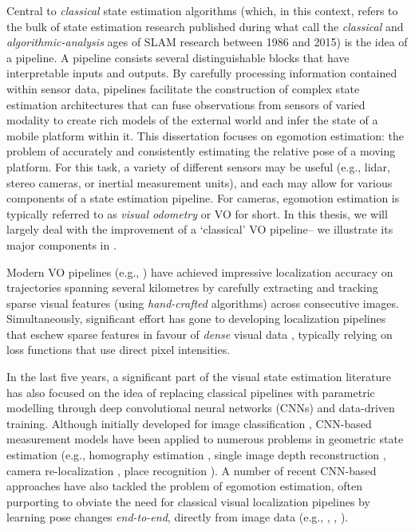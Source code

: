 Central to \textit{classical} state estimation algorithms (which, in this context, refers to the bulk of state estimation research published during what \cite{Cadena2016-ds} call the \textit{classical} and \textit{algorithmic-analysis} ages of SLAM research between 1986 and 2015) is the idea of a pipeline. A pipeline consists several distinguishable blocks that have interpretable inputs and outputs.  By carefully processing information contained within sensor data, pipelines facilitate the construction of complex state estimation architectures that can fuse observations from sensors of varied modality to create rich models of the external world and infer the state of a mobile platform within it. This dissertation focuses on egomotion estimation: the problem of accurately and consistently estimating the relative pose of a moving platform. For this task, a variety of different sensors may be useful (e.g., lidar, stereo cameras, or inertial measurement units), and each may allow for various components of a state estimation pipeline. For cameras, egomotion estimation is typically referred to as \textit{visual odometry} or VO for short. In this thesis, we will largely deal with the improvement of a `classical' VO pipeline-- we illustrate its major components in . 




Modern VO pipelines (e.g., \cite{Leutenegger2015-fk, Cvisic2015-mt, Tsotsos2015}) have achieved impressive localization accuracy on trajectories spanning several kilometres by carefully extracting and tracking sparse visual features (using \textit{hand-crafted} algorithms) across consecutive images. Simultaneously, significant effort has gone to developing localization pipelines that eschew sparse features in favour of \textit{dense} visual data \citep{Alcantarilla2016-kv, forster2014svo}, typically relying on loss functions that use direct pixel intensities. 

In the last five years, a significant part of the visual state estimation literature has also focused on the idea of replacing classical pipelines with parametric modelling through deep convolutional neural networks (CNNs) and data-driven training. Although initially developed for image classification  \citep{LeCun2015-qf}, CNN-based measurement models have been applied to numerous problems in geometric state estimation (e.g., homography estimation \citep{DeTone2016-ue}, single image depth reconstruction \citep{Garg2016-ip},  camera re-localization \citep{Kendall2016-zf}, place recognition \citep{Sunderhauf2015-is}). A number of recent CNN-based approaches have also tackled the problem of egomotion estimation, often purporting to obviate the need for classical visual localization pipelines by learning pose changes \textit{end-to-end}, directly from image data (e.g., \cite{Melekhov2017-dl}, \cite{Handa2016-hm}, \cite{Oliveira2017-lt}).

